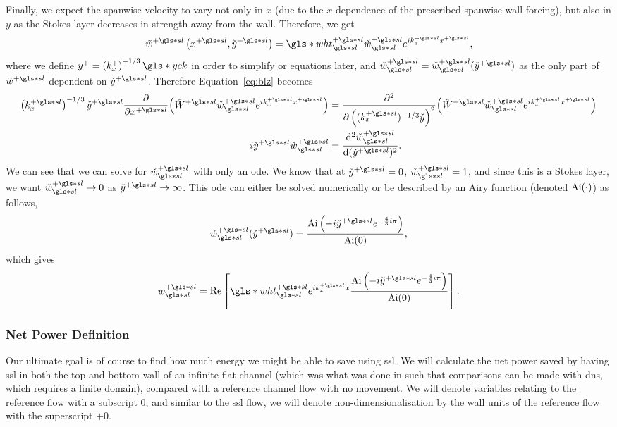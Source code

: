 Finally, we expect the spanwise velocity to vary not only in $x$ (due to the  $x$ dependence of the prescribed spanwise wall forcing), but also in  $y$ as the Stokes layer decreases in strength away from the wall. Therefore, we get
\begin{equation}
	\tilde{w}\ps\left(x\ps,\check{y}\ps\right)=\gls*{wht}\ps\ssl\check{w}\ssl\ps e^{ik\ps_x x\ps}\label{eq:wtlddef}
,\end{equation}
where we define $y^{+}=\left(k^{+}_x\right)^{-1 /3}\gls*{yck}$ in order to simplify or equations later, and $\check{w}\ssl \ps=\check{w}\ssl \ps(\check{y}\ps)$ as the only part of $\tilde{w}\ps$ dependent on $\check{y}\ps$.
Therefore Equation~\eqref{eq:blz} becomes
\begin{align}
	\left( k_x\ps \right) ^{-1 /3} \check{y}\ps \pdv{x\ps}(\hat{W}\ps \check{w}\ps\ssl e^{ik_x\ps x\ps})&= \pdv[2]{\left( (k_x\ps)^{-1 /3}\check{y} \right) }(\hat{W}\ps \check{w}\ps\ssl e^{ik_x\ps x\ps})\nonumber\\
	i \check{y}\ps \check{w}\ps\ssl &= \dv[2]{\check{w}\ps\ssl}{(\check{y}\ps)} 
.\end{align}
We can see that we can solve for $\check{w}\ps\ssl$ with only an \gls{ode}. We know that at $\check{y}\ps=0$, $\check{w}\ps\ssl=1$, and since this is a Stokes layer, we want $\check{w}\ps\ssl \to 0$ as $\check{y}\ps\to \infty$. This \gls{ode} can either be solved numerically or be described by an Airy function (denoted $\operatorname{Ai} (\cdot)$) as follows,
 \begin{equation}
	 \check{w}\ps\ssl(\check{y}\ps)= \frac{\Ai\left(-i \check{y}\ps e ^{-\frac{4}{3}i\pi}\right)}{\Ai(0)}\label{eq:wchecksoln}
,\end{equation}
which gives
\begin{equation}
	w\ps\ssl = \Re \left[ \gls*{wht}\ps\ssl e^{i k_{x}\ps x}\frac{\Ai\left(-i \check{y}\ps e ^{-\frac{4}{3}i\pi}\right)}{\Ai(0)}\right] 
.\end{equation}

\subsubsection{Net Power Definition}
Our ultimate goal is of course to find how much energy we might be able to save using \gls{ssl}. We will calculate the net power saved by having \gls{ssl} in both the top and bottom wall of an infinite flat channel (which was what was done in \textcite{viotti2009} such that comparisons can be made with \gls{dns}, which requires a finite domain), compared with a reference channel flow with no movement. We will denote variables relating to the reference flow with a subscript 0, and similar to the \gls{ssl} flow, we will denote non-dimensionalisation by the wall units of the reference flow with the superscript $+0$.

